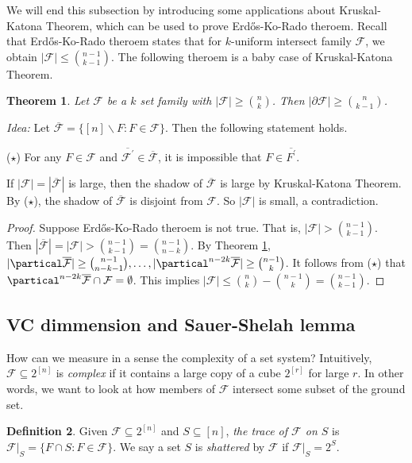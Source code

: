 \documentclass{article}
\newtheorem{theorem}{Theorem}[section]
\theoremstyle{definition}
\newtheorem{definition}[theorem]{Definition}
\begin{document}
We will end this subsection by introducing some applications about Kruskal-Katona Theorem, which   can be used to prove Erd\H{o}s-Ko-Rado theroem. Recall that  Erd\H{o}s-Ko-Rado theroem states that for $k$-uniform intersect family $\mathcal{F}$, we obtain $|\mathcal{F}|\leq \binom{n-1}{k-1}$. The following theroem is a baby case of Kruskal-Katona Theorem. 
\begin{theorem}\label{baby}
 Let $\mathcal{F}$ be a $k$ set family with 
    $|\mathcal{F}|\geq \binom{n}{k}$. Then $|\partial\mathcal{F}|\geq \binom{n}{k-1}$. 
\end{theorem}
\emph{Idea:} Let $\overline{\mathcal{F}}=\{[n]\backslash F: F\in \mathcal{F}\}$. Then the following statement holds.
 \begin{center}
     ($\star$) For any $F\in \mathcal{F}$ and $\overline{\mathcal{F}^\prime}\in \overline{\mathcal{F}}$, it is impossible that $F\in \overline{F^\prime}$.
 \end{center}
 If $|\mathcal{F}|=|\overline{\mathcal{F}}|$ is large, then  the shadow of $\overline{\mathcal{F}}$ is large by Kruskal-Katona Theorem. By ($\star$),  the shadow of $\overline{\mathcal{F}}$ is disjoint from $\mathcal{F}$. So $|\mathcal{F}|$ is small, a contradiction. 

\begin{proof}
    Suppose Erd\H{o}s-Ko-Rado theroem is not true. That is, $|\mathcal{F}|>\binom{n-1}{k-1}$. Then $|\overline{\mathcal{F}}|=|\mathcal{F}|>\binom{n-1}{k-1}=\binom{n-1}{n-k}$. By Theorem \ref{baby}, $|\partical\overline{\mathcal{F}}|\geq \binom{n-1}{n-k-1},\ldots, |\partical^{n-2k}\overline{\mathcal{F}}|\geq \binom{n-1}{k}$. It follows from ($\star$)  that $\partical^{n-2k}\overline{\mathcal{F}}\cap \mathcal{F}=\emptyset$. This implies $|\mathcal{F}|\leq \binom{n}{k}-\binom{n-1}{k}=\binom{n-1}{k-1}$. 
\end{proof}



\subsection{VC dimmension and Sauer-Shelah lemma}

How can we measure in a sense the complexity of a set system? Intuitively, $\mathcal{F}\subseteq 2^{[n]}$ is \emph{complex} if it contains a large copy of a cube $2^{[r]}$ for large $r$. In other words, we want to look at how members of $\mathcal{F}$ intersect some subset of the ground set. 

\begin{definition}
    Given $\mathcal{F}\subseteq 2^{[n]}$ and $S\subseteq [n]$, \emph{the trace of $\mathcal{F}$ on $S$} is $\mathcal{F}\big|_S=\{F\cap S: F\in \mathcal{F}\}$. We say a set $S$ is \emph{shattered} by $\mathcal{F}$ if $\mathcal{F}\big|_S=2^S$. 
\end{definition}
\end{document}
